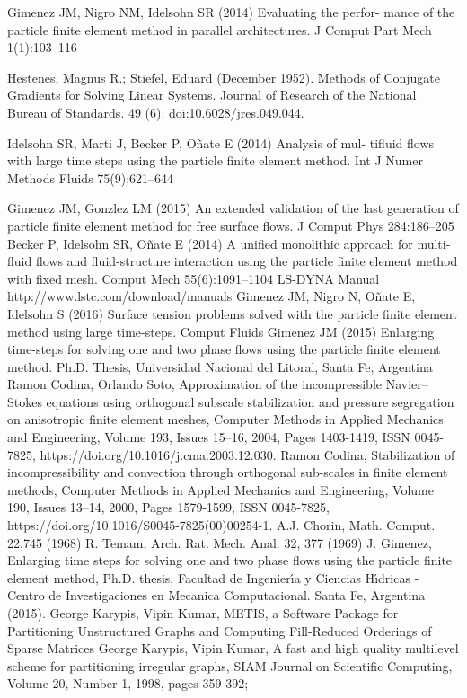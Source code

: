  Gimenez JM, Nigro NM, Idelsohn SR (2014) Evaluating the perfor-
mance of the particle finite element method in parallel architectures.
J Comput Part Mech 1(1):103–116

 Hestenes, Magnus R.; Stiefel, Eduard (December 1952). Methods of Conjugate Gradients for Solving Linear Systems. Journal of Research of the National Bureau of Standards. 49 (6). doi:10.6028/jres.049.044.

 Idelsohn SR, Marti J, Becker P, Oñate E (2014) Analysis of mul-
tifluid flows with large time steps using the particle finite element
method. Int J Numer Methods Fluids 75(9):621–644

 Gimenez JM, Gonzlez LM (2015) An extended validation of the
last generation of particle finite element method for free surface
flows. J Comput Phys 284:186–205
 Becker P, Idelsohn SR, Oñate E (2014) A unified monolithic
approach for multi-fluid flows and fluid-structure interaction using
the particle finite element method with fixed mesh. Comput Mech
55(6):1091–1104
 LS-DYNA Manual http://www.lstc.com/download/manuals
 Gimenez JM, Nigro N, Oñate E, Idelsohn S (2016) Surface tension
problems solved with the particle finite element method using large
time-steps. Comput Fluids
 Gimenez JM (2015) Enlarging time-steps for solving one and two
phase flows using the particle finite element method. Ph.D. Thesis,
Universidad Nacional del Litoral, Santa Fe, Argentina
 Ramon Codina, Orlando Soto,
Approximation of the incompressible Navier–Stokes equations using orthogonal subscale stabilization and pressure segregation on anisotropic finite element meshes,
Computer Methods in Applied Mechanics and Engineering,
Volume 193, Issues 15–16,
2004,
Pages 1403-1419,
ISSN 0045-7825,
https://doi.org/10.1016/j.cma.2003.12.030.
 Ramon Codina,
Stabilization of incompressibility and convection through orthogonal sub-scales in finite element methods,
Computer Methods in Applied Mechanics and Engineering,
Volume 190, Issues 13–14,
2000,
Pages 1579-1599,
ISSN 0045-7825,
https://doi.org/10.1016/S0045-7825(00)00254-1.
A.J. Chorin, Math. Comput. 22,745 (1968)
R. Temam, Arch. Rat. Mech. Anal. 32, 377 (1969)
  J. Gimenez, Enlarging time steps for solving one and two phase flows using the particle finite element
 method, Ph.D. thesis, Facultad de Ingenier\'{\i}a y Ciencias H\'{\i}dricas - Centro de Investigaciones en Mecanica
 Computacional. Santa Fe, Argentina (2015).
George Karypis, Vipin Kumar, METIS, a Software Package for Partitioning Unstructured Graphs and Computing Fill-Reduced Orderings of Sparse Matrices
George Karypis, Vipin Kumar, A fast and high quality multilevel scheme for partitioning irregular graphs, SIAM Journal on Scientific Computing, Volume 20, Number 1, 1998, pages 359-392; 

